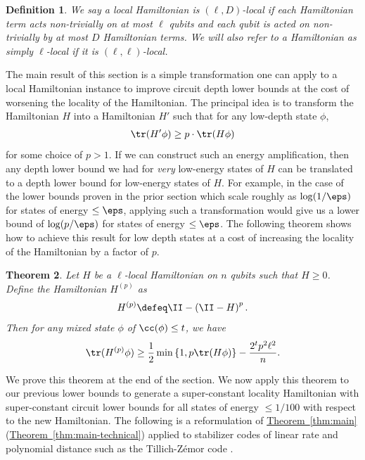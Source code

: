 \documentclass[11pt]{article}
\newcommand{\expref}[2]{\texorpdfstring{\hyperref[#2]{#1~\ref{#2}}}{#1~\ref{#2}}}
\newtheorem{theorem}{Theorem}[section]
\newtheorem{definition}[theorem]{Definition}
\begin{document}
\begin{definition}
We say a local Hamiltonian is $(\ell, D)$-local if each Hamiltonian term acts non-trivially on at most $\ell$ qubits and each qubit is acted on non-trivially by at most $D$ Hamiltonian terms. We will also refer to a Hamiltonian as simply $\ell$-local if it is $(\ell, \ell)$-local.
\end{definition}
The main result of this section is a simple transformation one can apply to a local Hamiltonian instance to improve circuit depth lower bounds at the cost of worsening the locality of the Hamiltonian. The principal idea is to transform the Hamiltonian $H$ into a Hamiltonian $H'$ such that for any low-depth state $\phi$, 
\begin{align}\tr(H' \phi) \geq p \cdot \tr(H \phi)
\end{align}
for some choice of $p > 1$. If we can construct such an energy amplification, then any depth lower bound we had for \emph{very} low-energy states of $H$ can be translated to a depth lower bound for low-energy states of $H$. For example, in the case of the lower bounds proven in the prior section which scale roughly as $\log (1/\eps)$ for states of energy $\leq \eps $, applying such a transformation would give us a lower bound of $\log(p/\eps)$ for states of energy $\leq \eps$.
The following theorem shows how to achieve this result for low depth states at a cost of increasing the locality of the Hamiltonian by a factor of $p$. 



\begin{theorem}
Let $H$ be a $\ell$-local Hamiltonian on $n$ qubits such that $H \geq 0$. Define the Hamiltonian $H^{(p)}$ as
\begin{align}
    H^{(p)} \defeq  \II - \left( \II - H \right)^p.
\end{align}
Then for any mixed state $\phi$ of $\cc(\phi) \leq t$, we have
\begin{align}
    \tr(H^{(p)} \phi) \geq \frac{1}{2} \min \left\{1, p \tr(H \phi ) \right\} - \frac{2^t p^2\ell^2}{n}.
\end{align}
\label{thm:amplification}
\end{theorem}

We prove this theorem at the end of the section. We now apply this theorem to our previous lower bounds to generate a super-constant locality Hamiltonian with super-constant circuit lower bounds for all states of energy $\leq 1/100$ with respect to the new Hamiltonian. The following is a reformulation of \expref{Theorem}{thm:main} (\expref{Theorem}{thm:main-technical}) applied to stabilizer codes of linear rate and polynomial distance such as the Tillich-Z\'emor code \cite{5205648}.
\end{document}
